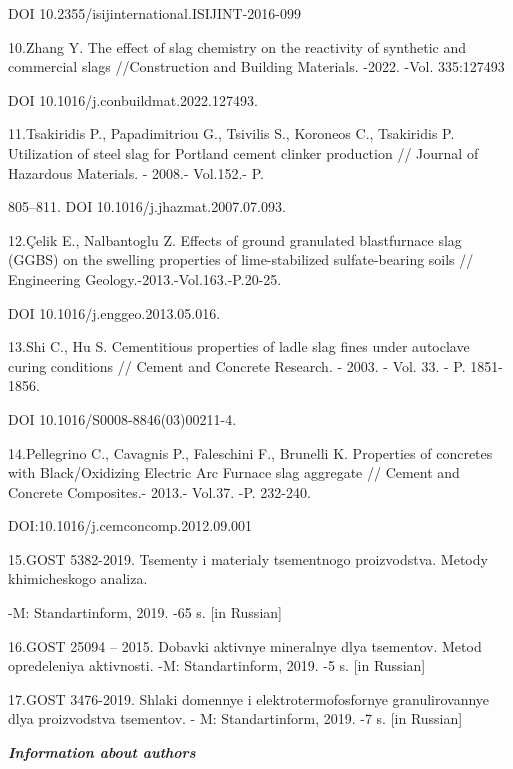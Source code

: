 \begin{noparindent}
DOI 10.2355/isijinternational.ISIJINT-2016-099

10.Zhang Y. The effect of slag chemistry on the reactivity of synthetic
and commercial slags //Construction and Building Materials. -2022. -Vol.
335:127493

DOI 10.1016/j.conbuildmat.2022.127493.

11.Tsakiridis P., Papadimitriou G., Tsivilis S., Koroneos C., Tsakiridis
P. Utilization of steel slag for Portland cement clinker production //
Journal of Hazardous Materials. - 2008.- Vol.152.- P.

805--811. DOI 10.1016/j.jhazmat.2007.07.093.

12.Çelik E., Nalbantoglu Z. Effects of ground granulated blastfurnace
slag (GGBS) on the swelling properties of lime-stabilized
sulfate-bearing soils // Engineering Geology.-2013.-Vol.163.-P.20-25.

DOI 10.1016/j.enggeo.2013.05.016.

13.Shi C., Hu S. Cementitious properties of ladle slag fines under
autoclave curing conditions // Cement and Concrete Research. - 2003. -
Vol. 33. - P. 1851-1856.

DOI 10.1016/S0008-8846(03)00211-4.

14.Pellegrino C., Cavagnis P., Faleschini F., Brunelli K. Properties of
concretes with Black/Oxidizing Electric Arc Furnace slag aggregate //
Cement and Concrete Composites.- 2013.- Vol.37. -P. 232-240.

DOI:10.1016/j.cemconcomp.2012.09.001

15.GOST 5382-2019. Tsementy i materialy tsementnogo proizvodstva. Metody
khimicheskogo analiza.

-M: Standartinform, 2019. -65 s. {[}in Russian{]}

16.GOST 25094 -- 2015. Dobavki aktivnye mineral\textquotesingle nye dlya
tsementov. Metod opredeleniya aktivnosti. -M: Standartinform, 2019. -5
s. {[}in Russian{]}

17.GOST 3476-2019. Shlaki domennye i elektrotermofosfornye
granulirovannye dlya proizvodstva tsementov. - M: Standartinform, 2019.
-7 s. {[}in Russian{]}
\end{noparindent}

\emph{{\bfseries Information about authors}}

